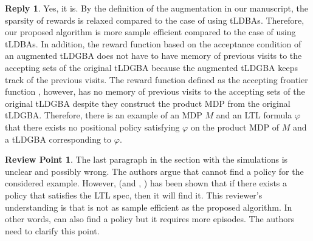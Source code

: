 \documentclass[10 pt, dvipdfmx]{article}
\theoremstyle{definition}
\newtheorem{review point}{Review Point}[section]
\newtheorem*{reply}{Reply}
\begin{document}
\begin{reply}
  Yes, it is. By the definition of the augmentation in our manuscript, the sparsity of rewards is relaxed compared to the case of using tLDBAs. Therefore, our proposed algorithm is more sample efficient compared to the case of using tLDBAs. In addition, the reward function based on the acceptance condition of an augmented tLDGBA does not have to have memory of previous visits to the accepting sets of the original tLDGBA because the augmented tLDGBA keeps track of the previous visits. The reward function defined as the accepting frontier function \cite{HAK2019}, however, has no memory of previous visits to the accepting sets of the original tLDGBA despite they construct the product MDP from the original tLDGBA. Therefore, there is an example of an MDP $M$ and an LTL formula $\varphi$ that there exists no positional policy satisfying $\varphi$ on the product MDP of $M$ and a tLDGBA corresponding to $\varphi$.
\end{reply}

\begin{review point}
  The last paragraph in the section with the simulations is unclear
and possibly wrong. The authors argue that \cite{HAK2019} cannot find a policy
for the considered example. However, \cite{HAK2019} (and \cite{HKAKPL2019}, \cite{BWZP2019}) has been
shown that if there exists a policy that satisfies the LTL spec, then
it will find it. This reviewer's understanding is that \cite{HAK2019} is not as
sample efficient as the proposed algorithm. In other words, \cite{HAK2019} can
also find a policy but it requires more episodes. The authors need to
clarify this point.
\end{review point}
\end{document}
